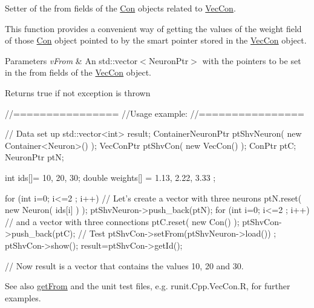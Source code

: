 Setter of the from fields of the \hyperlink{class_con}{Con} objects related to \hyperlink{class_vec_con}{VecCon}. 

This function provides a convenient way of getting the values of the weight field of those \hyperlink{class_con}{Con} object pointed to by the smart pointer stored in the \hyperlink{class_vec_con}{VecCon} object.


\begin{DoxyParams}{Parameters}
{\em vFrom} & An std::vector$<$NeuronPtr$>$ with the pointers to be set in the from fields of the \hyperlink{class_vec_con}{VecCon} object.\\
\hline
\end{DoxyParams}
\begin{DoxyReturn}{Returns}
true if not exception is thrown
\end{DoxyReturn}

\begin{DoxyCode}
        //================
        //Usage example:
        //================

        // Data set up
                std::vector<int> result;
                ContainerNeuronPtr      ptShvNeuron( new Container<Neuron>() );
                VecConPtr       ptShvCon( new VecCon() );
                ConPtr  ptC;
                NeuronPtr ptN;

                int ids[]= {10, 20, 30};
                double weights[] = {1.13, 2.22, 3.33 };

                for (int i=0; i<=2 ; i++) {                             // Let's 
      create a vector with three neurons
                        ptN.reset( new Neuron( ids[i] ) );
                        ptShvNeuron->push_back(ptN);
                }
                for (int i=0; i<=2 ; i++) {                             // and a 
      vector with three connections
                        ptC.reset( new Con() );
                        ptShvCon->push_back(ptC);
                }
        // Test
                ptShvCon->setFrom(ptShvNeuron->load()) ;
                ptShvCon->show();
                result=ptShvCon->getId();

        // Now result is a vector that contains the values 10, 20 and 30.
\end{DoxyCode}


\begin{DoxySeeAlso}{See also}
\hyperlink{class_vec_con_aee24ad1e9f3a8af771bef14cac0bf71d}{getFrom} and the unit test files, e.g. runit.Cpp.VecCon.R, for further examples. 
\end{DoxySeeAlso}


